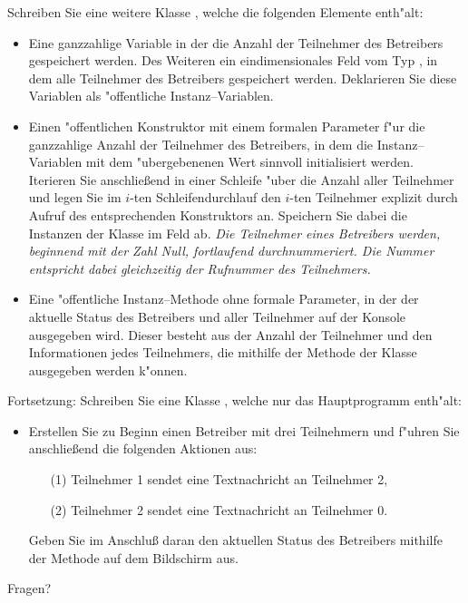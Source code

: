 \documentclass[c,18pt]{beamer}
\begin{document}
\begin{frame}
Schreiben Sie eine weitere Klasse , welche die folgenden
Elemente enth"alt:
\begin{itemize}
\item
Eine ganzzahlige Variable  in der die Anzahl der Teilnehmer
des Betreibers gespeichert werden. Des Weiteren ein eindimensionales Feld
 vom Typ ,
in dem alle Teilnehmer des Betreibers gespeichert werden.
Deklarieren Sie diese Variablen als "offentliche Instanz--Variablen.
\item
Einen "offentlichen Konstruktor mit einem formalen Parameter f"ur die ganzzahlige Anzahl
der Teilnehmer des Betreibers, in dem die Instanz--Variablen mit
dem "ubergebenenen Wert sinnvoll initialisiert werden.
Iterieren Sie anschlie\ss end in einer Schleife "uber die Anzahl aller Teilnehmer und
legen Sie im $i$-ten Schleifendurchlauf den $i$-ten Teilnehmer
explizit durch Aufruf des entsprechenden Konstruktors an. Speichern Sie dabei die Instanzen
der Klasse  im Feld  ab.
\emph{
Die Teilnehmer eines Betreibers werden,
beginnend mit der Zahl Null, fortlaufend durchnummeriert.
Die Nummer entspricht dabei gleichzeitig der Rufnummer
des Teilnehmers.}
\item
Eine "offentliche Instanz--Methode
 ohne formale Parameter, in der der aktuelle Status des Betreibers
und aller Teilnehmer auf der Konsole ausgegeben wird. Dieser besteht aus
der Anzahl der Teilnehmer und den Informationen jedes Teilnehmers, die mithilfe
der  Methode der Klasse  ausgegeben werden k"onnen.
\end{itemize}

\end{frame}

\begin{frame}
Fortsetzung:
Schreiben Sie eine Klasse , welche nur das Hauptprogramm enth"alt:
\begin{itemize}
\item
Erstellen Sie zu Beginn einen Betreiber  mit drei Teilnehmern und f"uhren
Sie anschlie{\ss}end die folgenden Aktionen aus:
\begin{itemize}
\item[(1)]
Teilnehmer 1 sendet eine Textnachricht an Teilnehmer 2,
\item[(2)]
Teilnehmer 2 sendet eine Textnachricht an Teilnehmer 0.
\end{itemize}
Geben Sie im Anschlu{\ss} daran den aktuellen Status des Betreibers
mithilfe der Methode  auf dem Bildschirm aus.
\end{itemize}
\end{frame}



\begin{frame}
\centering
\Huge\textcolor{KITgreen}{Fragen?}
\end{frame}


\end{document}
